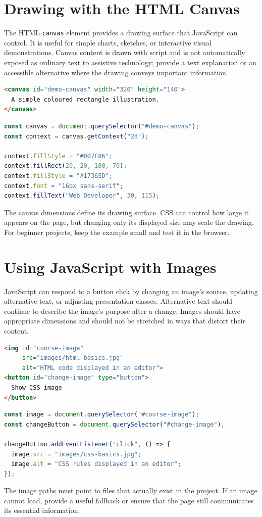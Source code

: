\documentclass[11pt,openany,oneside]{book}
\begin{document}
\section{Drawing with the HTML Canvas}
The HTML \texttt{canvas} element provides a drawing surface that JavaScript can control. It is useful for simple charts, sketches, or interactive visual demonstrations. Canvas content is drawn with script and is not automatically exposed as ordinary text to assistive technology; provide a text explanation or an accessible alternative where the drawing conveys important information.

\begin{lstlisting}[style=webcode,language=HTML]
<canvas id="demo-canvas" width="320" height="140">
  A simple coloured rectangle illustration.
</canvas>
\end{lstlisting}

\begin{lstlisting}[style=webcode,language=JavaScript]
const canvas = document.querySelector("#demo-canvas");
const context = canvas.getContext("2d");

context.fillStyle = "#007F86";
context.fillRect(20, 20, 180, 70);
context.fillStyle = "#17365D";
context.font = "16px sans-serif";
context.fillText("Web Developer", 30, 115);
\end{lstlisting}
The canvas dimensions define its drawing surface. CSS can control how large it appears on the page, but changing only its displayed size may scale the drawing. For beginner projects, keep the example small and test it in the browser.

\section{Using JavaScript with Images}
JavaScript can respond to a button click by changing an image's source, updating alternative text, or adjusting presentation classes. Alternative text should continue to describe the image's purpose after a change. Images should have appropriate dimensions and should not be stretched in ways that distort their content.

\begin{lstlisting}[style=webcode,language=HTML]
<img id="course-image"
     src="images/html-basics.jpg"
     alt="HTML code displayed in an editor">
<button id="change-image" type="button">
  Show CSS image
</button>
\end{lstlisting}

\begin{lstlisting}[style=webcode,language=JavaScript]
const image = document.querySelector("#course-image");
const changeButton = document.querySelector("#change-image");

changeButton.addEventListener("click", () => {
  image.src = "images/css-basics.jpg";
  image.alt = "CSS rules displayed in an editor";
});
\end{lstlisting}
The image paths must point to files that actually exist in the project. If an image cannot load, provide a useful fallback or ensure that the page still communicates its essential information.
\end{document}
